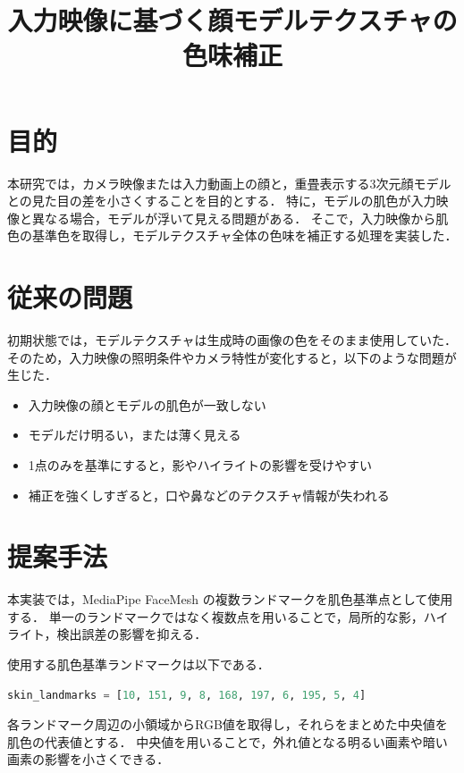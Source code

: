 \documentclass[uplatex,dvipdfmx]{jsarticle}
\title{入力映像に基づく顔モデルテクスチャの色味補正}
\author{}
\date{}
\begin{document}
\maketitle

\section{目的}

本研究では，カメラ映像または入力動画上の顔と，重畳表示する3次元顔モデルとの見た目の差を小さくすることを目的とする．
特に，モデルの肌色が入力映像と異なる場合，モデルが浮いて見える問題がある．
そこで，入力映像から肌色の基準色を取得し，モデルテクスチャ全体の色味を補正する処理を実装した．

\section{従来の問題}

初期状態では，モデルテクスチャは生成時の画像の色をそのまま使用していた．
そのため，入力映像の照明条件やカメラ特性が変化すると，以下のような問題が生じた．

\begin{itemize}
  \item 入力映像の顔とモデルの肌色が一致しない
  \item モデルだけ明るい，または薄く見える
  \item 1点のみを基準にすると，影やハイライトの影響を受けやすい
  \item 補正を強くしすぎると，口や鼻などのテクスチャ情報が失われる
\end{itemize}

\section{提案手法}

本実装では，MediaPipe FaceMesh の複数ランドマークを肌色基準点として使用する．
単一のランドマークではなく複数点を用いることで，局所的な影，ハイライト，検出誤差の影響を抑える．

使用する肌色基準ランドマークは以下である．

\begin{lstlisting}[language=Python]
skin_landmarks = [10, 151, 9, 8, 168, 197, 6, 195, 5, 4]
\end{lstlisting}

各ランドマーク周辺の小領域からRGB値を取得し，それらをまとめた中央値を肌色の代表値とする．
中央値を用いることで，外れ値となる明るい画素や暗い画素の影響を小さくできる．
\end{document}
